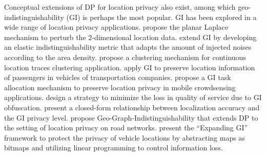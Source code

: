 \documentclass[10pt,journal,compsoc]{IEEEtran}
\begin{document}
Conceptual extensions of DP for location privacy also exist, among which  geo-indistinguishability  (GI) \cite{andres2013geo} is perhaps the most popular. GI has been explored in a wide range of location privacy applications.  \citet{andres2013geo} propose the planar Laplace mechanism  to perturb the 2-dimensional location data.    \citet{chatzikokolakis2015constructing} extend GI by developing an elastic indistinguishability metric that adapts the amount of injected noises according to the area density. \citet{cunha2019clustering} propose a clustering  mechanism for continuous location traces clustering application.  \citet{shi2019deep} apply  GI to preserve location information of passengers in vehicles of transportation companies.   \citet{qian2020privacy} propose a GI task allocation  mechanism to preserve location privacy in mobile crowdsensing applications. \citet{qiu2020location} design a strategy to minimize the loss in quality of service  due to GI obfuscation. \citet{shi2020quantitative} present a closed-form relationship between localization accuracy and the  GI privacy level. \citet{takagi2020poster} propose  Geo-Graph-Indistinguishability that extends DP to the setting of location privacy on road networks. \citet{ren2020egeoindis} present the ``Expanding GI'' framework to protect the privacy of vehicle locations by abstracting maps as bitmaps and utilizing linear programming to control information loss. 
\end{document}
